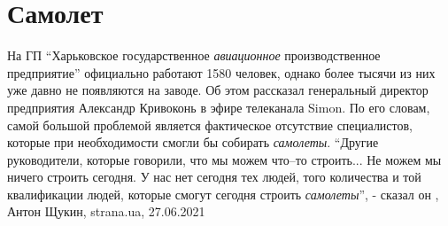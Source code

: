  
 
 
 
 
\chapter{Самолет}
\label{sec:slova.samolet}

На ГП \enquote{Харьковское государственное \emph{авиационное} производственное
предприятие} официально работают 1580 человек, однако более тысячи из них уже
давно не появляются на заводе.  Об этом рассказал генеральный директор
предприятия Александр Кривоконь в эфире телеканала Simon.  По его словам, самой
большой проблемой является фактическое отсутствие специалистов, которые при
необходимости смогли бы собирать \emph{самолеты}.  \enquote{Другие
руководители, которые говорили, что мы можем что–то строить... Не можем мы
ничего строить сегодня. У нас нет сегодня тех людей, того количества и той
квалификации людей, которые смогут сегодня строить \emph{самолеты}}, - сказал
он
, Антон Щукин, strana.ua, 27.06.2021


